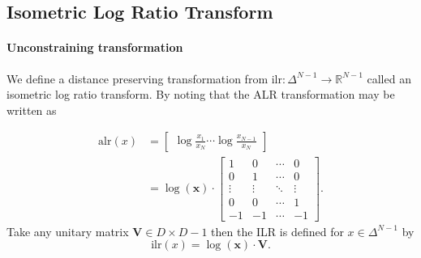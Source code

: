 \documentclass[11pt]{article}
\newcommand{\abs}[1]{\left| #1 \right|}
\begin{document}



\subsection{Isometric Log Ratio Transform}

\paragraph{Unconstraining transformation}
We define a distance preserving transformation from $\textrm{ilr}:\Delta^{N-1} \rightarrow \mathbb{R}^{N-1}$ called an isometric log ratio transform. By noting that the ALR transformation may be written as

\[
  \begin{aligned}
 \textrm{alr}(x) &= \begin{bmatrix}\displaystyle
    \log \frac{x_1}{x_N} \cdots \log \frac{x_{N-1}}{x_N}
  \end{bmatrix} \\
  &= \log(\mathbf{x}) \cdot \begin{bmatrix}\displaystyle
                    1 & 0 & \cdots & 0 \\
                    0 & 1 & \cdots & 0 \\
                    \vdots & \vdots & \ddots & \vdots \\
                    0 & 0 & \cdots & 1 \\
                    -1 & -1 & \cdots & -1
                    \end{bmatrix}.
  \end{aligned}
\]
Take any unitary matrix $\mathbf{V} \in D \times D - 1$ then the ILR is defined for $x \in \Delta^{N-1}$ by
\[
  \textrm{ilr}(x)
  = \log(\mathbf{x}) \cdot \mathbf{V}.
\]
\end{document}
